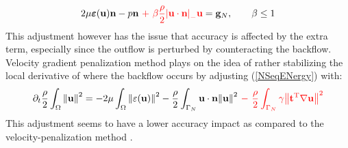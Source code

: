 \begin{align}\label{vp}
    2\mu\bm{\varepsilon} (\textbf{u})\textbf{n} - p{\bf n} ~{\color{red} + ~\beta\frac{\rho}{2}\abs{\bf\textbf{u}\cdot n}_{-}\textbf{u}} = {\bf g}_{N}, \qquad \beta \leq 1
\end{align}
This adjustment however has the issue that accuracy is affected by the extra term, especially since the outflow is perturbed by counteracting the backflow. Velocity gradient penalization method plays on the idea of rather stabilizing the local derivative of where the backflow occurs by adjusting (\ref{NSeqENergy}) with:  
\begin{align}\label{vgp}
\partial_t\frac{\rho}{2}\int_{\Omega}\norm{\textbf{u}}^2 = -2\mu\int_{\Omega}\norm{\varepsilon(\textbf{u})}^2 - \frac{\rho}{2}\int_{\Gamma_{N}}\textbf{u}\cdot\textbf{n}\norm{\textbf{u}}^2 ~{\color{red}- ~\frac{\rho}{2}\int_{\Gamma_{N}}\gamma\norm{{\bf t^{\text{T}}\nabla}\textbf{u}}^2}
\end{align}
This adjustment seems to have a lower accuracy impact as compared to the velocity-penalization method \cite{bertoglio2017}. 

